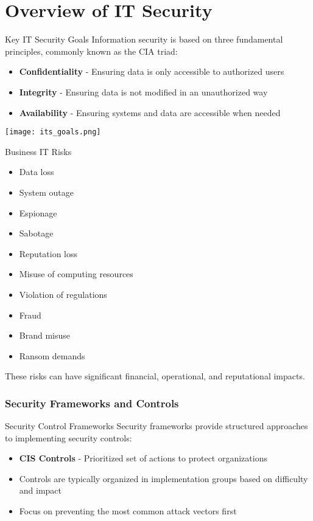 


\section{Overview of IT Security}


\begin{definition}{Key IT Security Goals}
Information security is based on three fundamental principles, commonly known as the CIA triad:
\begin{itemize}
    \item \textbf{Confidentiality} - Ensuring data is only accessible to authorized users
    \item \textbf{Integrity} - Ensuring data is not modified in an unauthorized way
    \item \textbf{Availability} - Ensuring systems and data are accessible when needed
\end{itemize}
\texttt{[image: its\_goals.png]}
\end{definition}

\begin{concept}{Business IT Risks}
\begin{itemize}
    \item Data loss
    \item System outage
    \item Espionage
    \item Sabotage
    \item Reputation loss
    \item Misuse of computing resources
    \item Violation of regulations
    \item Fraud
    \item Brand misuse
    \item Ransom demands
\end{itemize}
These risks can have significant financial, operational, and reputational impacts.
\end{concept}

\multend

\raggedcolumns

\subsubsection{Security Frameworks and Controls}


\begin{concept}{Security Control Frameworks}
Security frameworks provide structured approaches to implementing security controls:
\begin{itemize}
    \item \textbf{CIS Controls} - Prioritized set of actions to protect organizations
    \item Controls are typically organized in implementation groups based on difficulty and impact
    \item Focus on preventing the most common attack vectors first
\end{itemize}
\end{concept}

